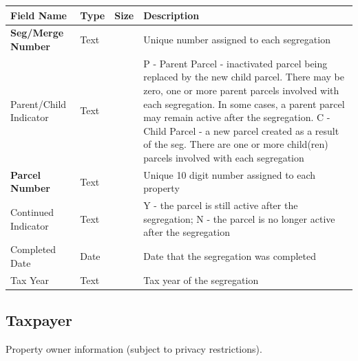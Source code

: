\documentclass[
  english,
  letterpaper,
  DIV=11,
  numbers=noendperiod]{scrreprt}
\begin{document}
\begin{longtable}[]{@{}
  >{\raggedright\arraybackslash}p{}
  >{\raggedright\arraybackslash}p{}
  >{\raggedright\arraybackslash}p{}
  >{\raggedright\arraybackslash}p{}@{}}
\toprule\noalign{}
\begin{minipage}[b]{\linewidth}\raggedright
Field Name
\end{minipage} & \begin{minipage}[b]{\linewidth}\raggedright
Type
\end{minipage} & \begin{minipage}[b]{\linewidth}\raggedright
Size
\end{minipage} & \begin{minipage}[b]{\linewidth}\raggedright
Description
\end{minipage} \\
\midrule\noalign{}
\endhead
\bottomrule\noalign{}
\endlastfoot
\textbf{Seg/Merge Number} & Text & 12 & Unique number assigned to each
segregation \\
Parent/Child Indicator & Text & 1 & P - Parent Parcel - inactivated
parcel being replaced by the new child parcel. There may be zero, one or
more parent parcels involved with each segregation. In some cases, a
parent parcel may remain active after the segregation. C - Child Parcel
- a new parcel created as a result of the seg. There are one or more
child(ren) parcels involved with each segregation \\
\textbf{Parcel Number} & Text & 10 & Unique 10 digit number assigned to
each property \\
Continued Indicator & Text & 1 & Y - the parcel is still active after
the segregation; N - the parcel is no longer active after the
segregation \\
Completed Date & Date & & Date that the segregation was completed \\
Tax Year & Text & 4 & Tax year of the segregation \\
\end{longtable}

\subsection{Taxpayer}

Property owner information (subject to privacy restrictions).
\end{document}
